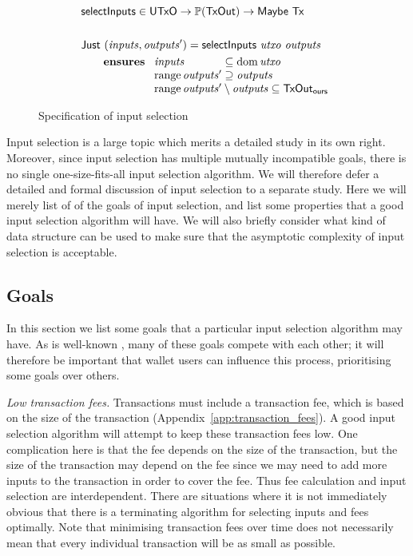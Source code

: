 \documentclass{article}
\DeclareMathOperator{\dom}{dom}
\DeclareMathOperator{\range}{range}
\numberwithin{equation}{lemma}
\begin{document}
\begin{figure}
\begin{align*}
& \mathsf{selectInputs} \in \mathsf{UTxO} \to \mathbb{P}(\mathsf{TxOut}) \to \mathsf{Maybe} ~ \mathsf{Tx} \\
\\
& \mathsf{Just} ~ (\mathit{inputs}, \mathit{outputs}') = \mathsf{selectInputs} ~ \mathit{utxo} ~ \mathit{outputs} \\
& \qquad \mathbf{ensures~}
\begin{array}[t]{l@{\;}l@{\;}l}
\mathit{inputs}          & \subseteq & \dom \mathit{utxo} \\
\range \mathit{outputs}' & \supseteq & \mathit{outputs}   \\
\multicolumn{3}{l}{\range \mathit{outputs}' \setminus \mathit{outputs} \subseteq \mathsf{TxOut_{ours}}} \\
\end{array}
\end{align*}
\caption{\label{fig:input_selection_sig}Specification of input selection}
\end{figure}

Input selection is a large topic which merits a detailed study in its own right.
Moreover, since input selection has multiple mutually incompatible goals, there
is no single one-size-fits-all input selection algorithm.  We will therefore
defer a detailed and formal discussion of input selection to a separate study.
Here we will merely list of of the goals of input selection, and list some
properties that a good input selection algorithm will have. We will also
briefly consider what kind of data structure can be used to make sure that
the asymptotic complexity of input selection is acceptable.

\subsection{Goals}

In this section we list some goals that a particular input selection algorithm
may have. As is well-known \citep{lopp:challenges}, many of these goals compete
with each other; it will therefore be important that wallet users can influence
this process, prioritising some goals over others.

\emph{Low transaction fees.}
Transactions must include a transaction fee, which is based on the size of the
transaction (Appendix~\ref{app:transaction_fees}). A good input selection
algorithm will attempt to keep these transaction fees low. One complication here
is that the fee depends on the size of the transaction, but the size of
the transaction may depend on the fee since we may need to add more inputs to
the transaction in order to cover the fee. Thus fee calculation and input
selection are interdependent. There are situations where it is not immediately
obvious that there is a terminating algorithm for selecting inputs and fees
optimally. Note that minimising transaction fees over time does not necessarily
mean that every individual transaction will be as small as possible.
\end{document}

